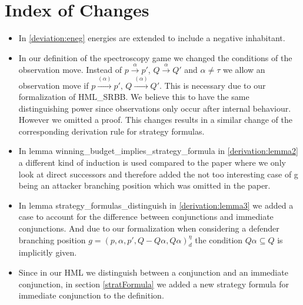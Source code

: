 \section{Index of Changes}
\begin{itemize}
    \item In \ref{deviation:eneg} energies are extended to include a negative inhabitant. 
    \item In our definition of the spectroscopy game we changed the conditions of the observation move. 
    Instead of $p \overset{\alpha}{\longrightarrow}p'$, $Q \overset{\alpha}{\longrightarrow} Q'$ and $\alpha \neq \tau$
    we allow an observation move if  $p \overset{(\alpha)}{\longrightarrow}p'$, $Q \overset{(\alpha)}{\longrightarrow} Q'$.
    This is necessary due to our formalization of HML_{SRBB}. We believe this to have the same distinguishing power 
    since observations only occur after internal behaviour. However we omitted a proof. 
    This changes results in a similar change of the corresponding derivation rule for strategy formulas.
    \item In lemma winning\_budget\_implies\_strategy\_formula in \ref{derivation:lemma2} a different kind of induction is used compared to the paper 
    where we only look at direct successors and therefore added the not too interesting case of g being an 
    attacker branching position which was omitted in the paper.
   \item In lemma strategy\_formulas\_distinguish in  \ref{derivation:lemma3} we added a case to account for the difference between 
conjunctions and immediate conjunctions. And due to our formalization when considering a
defender branching position $g=(p,\alpha ,p', Q - Q\alpha, Q\alpha)_d^\eta$ the condition 
$Q \alpha \subseteq Q$ is implicitly given.
  \item Since in our HML we distinguish between a conjunction and an immediate conjunction, in section \ref{stratFormula} 
we added a new strategy formula for immediate conjunction to the definition.
\end{itemize}
